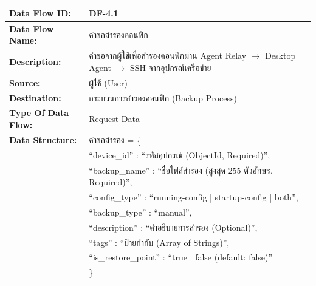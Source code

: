 
\begin{table}[H]
    \caption{}
    \label{tab:df-4-1}
    \fontSixTeen 
    \begin{tabularx}{\textwidth}{|l|L|} 
        \hline
        \textbf{Data Flow ID:} & DF-4.1 \\
        \hline
        \textbf{Data Flow Name:} & คำขอสำรองคอนฟิก \\
        \hline
        \textbf{Description:} & คำขอจากผู้ใช้เพื่อสำรองคอนฟิกผ่าน Agent Relay $\rightarrow$ Desktop Agent $\rightarrow$ SSH จากอุปกรณ์เครือข่าย \\
        \hline
        \textbf{Source:} & ผู้ใช้ (User) \\
        \hline
        \textbf{Destination:} & กระบวนการสำรองคอนฟิก (Backup Process) \\
        \hline
        \textbf{Type Of Data Flow:} & Request Data \\
        \hline
        \textbf{Data Structure:} & คำขอสำรอง = \{ \nonumber \\
                        & \hspace{1em} ``device\_id'' : ``รหัสอุปกรณ์ (ObjectId, Required)'', \nonumber \\
                        & \hspace{1em} ``backup\_name'' : ``ชื่อไฟล์สำรอง (สูงสุด 255 ตัวอักษร, Required)'', \nonumber \\
                        & \hspace{1em} ``config\_type'' : ``running-config | startup-config | both'', \nonumber \\
                        & \hspace{1em} ``backup\_type'' : ``manual'', \nonumber \\
                        & \hspace{1em} ``description'' : ``คำอธิบายการสำรอง (Optional)'', \nonumber \\
                        & \hspace{1em} ``tags'' : ``ป้ายกำกับ (Array of Strings)'', \nonumber \\
                        & \hspace{1em} ``is\_restore\_point'' : ``true | false (default: false)'' \nonumber \\
                        & \} \\
        \hline
    \end{tabularx}
\end{table}

